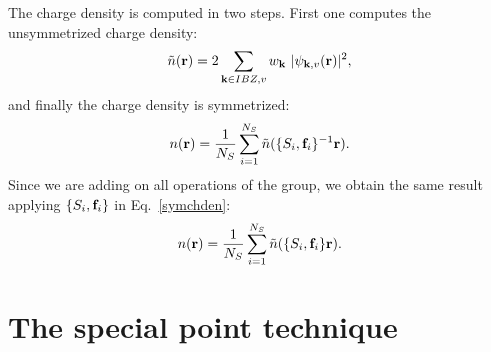 \documentclass[12pt,a4paper,twoside]{report}
\begin{document}
The charge density is computed in two steps. First one computes the unsymmetrized charge density:
\begin{equation}
\tilde n({\bf r}) = 2 \sum_{{\bf k}\in IBZ , v} w_{\bf k}\ |\psi_{{\bf k}, v} ({\bf r}) |^2,
\label{unsymchden}
\end{equation}
and finally the charge density is symmetrized:
\begin{equation}
n({\bf r}) = {1 \over N_S} \sum_{i=1}^{N_S} \tilde n ( \{S_i,{\bf f}_i\}^{-1} {\bf r}).
\label{symchden}
\end{equation}
Since we are adding on all operations of the group, we obtain the same result applying $\{S_i,{\bf f}_i\}$ in Eq.~\ref{symchden}:
\begin{equation}
n({\bf r}) = {1 \over N_S} \sum_{i=1}^{N_S} \tilde n ( \{S_i,{\bf f}_i\} {\bf r}).
\label{symchden1}
\end{equation}


\section{The special point technique}
\end{document}

